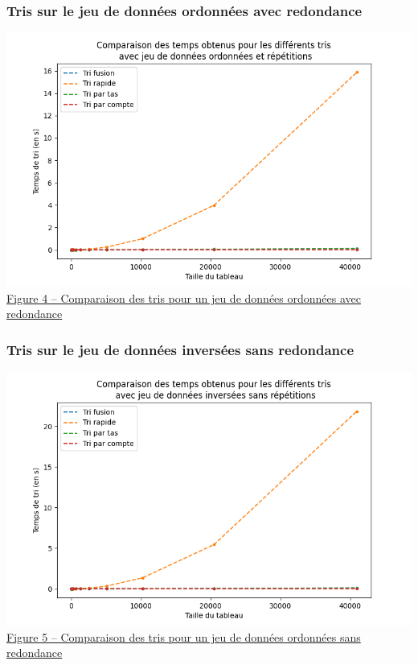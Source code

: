 \documentclass[11pt,a4paper]{article}
\begin{document}
\subsubsection{Tris sur le jeu de données ordonnées avec redondance}
\includegraphics[scale = 0.5]{Images/Courbes img/trié avec rep/ordonnées avec répétitions.png}\\
\underline {Figure 4 – Comparaison des tris pour un jeu de données ordonnées avec redondance}

\subsubsection{Tris sur le jeu de données inversées sans redondance}
\includegraphics[scale = 0.5]{Images/Courbes img/inversé sans rep/inversées sans répétitions.png}\\
\underline {Figure 5 – Comparaison des tris pour un jeu de données ordonnées sans redondance}
\end{document}
